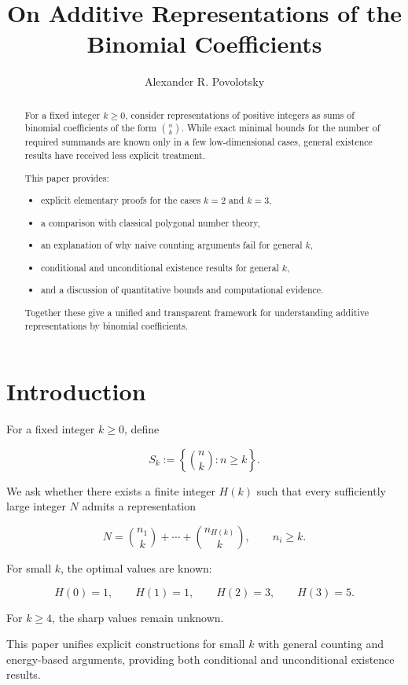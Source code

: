 \documentclass[11pt]{amsart}
\title{On Additive Representations of the Binomial Coefficients}
\author{Alexander R. Povolotsky}
\begin{document}
\maketitle

\begin{abstract}
For a fixed integer $k \ge 0$, consider representations of positive integers
as sums of binomial coefficients of the form $\binom{n}{k}$. While exact
minimal bounds for the number of required summands are known only in a few
low-dimensional cases, general existence results have received less explicit
treatment.

This paper provides:
\begin{itemize}
\item explicit elementary proofs for the cases $k=2$ and $k=3$,
\item a comparison with classical polygonal number theory,
\item an explanation of why naive counting arguments fail for general $k$,
\item conditional and unconditional existence results for general $k$,
\item and a discussion of quantitative bounds and computational evidence.
\end{itemize}

Together these give a unified and transparent framework for understanding
additive representations by binomial coefficients.
\end{abstract}

\section{Introduction}

For a fixed integer $k \ge 0$, define

\[
S_k := \left\{ \binom{n}{k} : n \ge k \right\}.
\]

We ask whether there exists a finite integer $H(k)$ such that every sufficiently
large integer $N$ admits a representation

\[
N = \binom{n_1}{k} + \cdots + \binom{n_{H(k)}}{k}, \qquad n_i \ge k.
\]

For small $k$, the optimal values are known:

\[
H(0)=1,\qquad H(1)=1,\qquad H(2)=3,\qquad H(3)=5.
\]

For $k \ge 4$, the sharp values remain unknown.

This paper unifies explicit constructions for small $k$ with general counting
and energy-based arguments, providing both conditional and unconditional
existence results.
\end{document}
